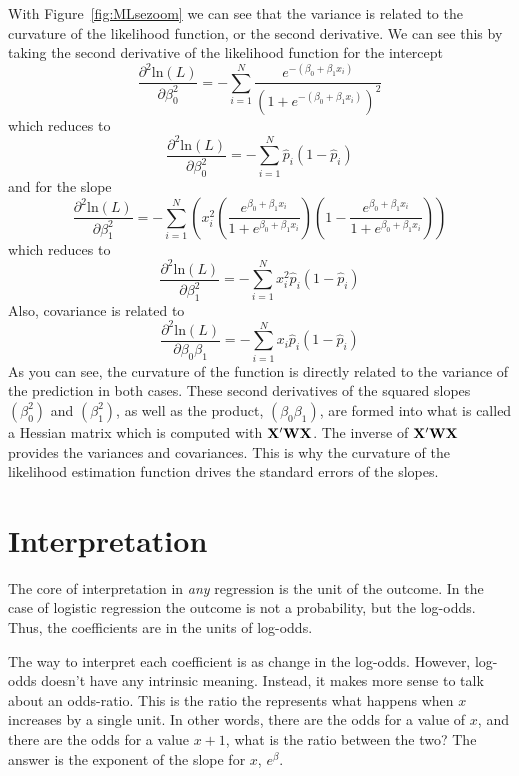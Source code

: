 With Figure~\ref{fig:MLsezoom} we can see that the variance is related to the curvature of the likelihood function, or the second derivative. We can see this by taking the second derivative of the likelihood function for the intercept
\[
\frac{\partial^2\mbox{ln}\left(L\right)}{\partial\beta_0^2}=-\sum_{i=1}^N\frac{e^{-\left(\beta_0+\beta_1x_i\right)}}{\left(1+e^{-\left(\beta_0+\beta_1x_i\right)}\right)^2}
\]
which reduces to
\begin{equation}
\frac{\partial^2\mbox{ln}\left(L\right)}{\partial\beta_0^2}=-\sum_{i=1}^N\hat{p}_i\left(1-\hat{p}_i\right)
\end{equation}
and for the slope
\[
\frac{\partial^2\mbox{ln}\left(L\right)}{\partial\beta_1^2} = -\sum_{i=1}^N\left(x_i^2\left(\frac{e^{\beta_0+\beta_1x_i}}{1+e^{\beta_0+\beta_1x_i}}\right)\left(1-\frac{e^{\beta_0+\beta_1x_i}}{1+e^{\beta_0+\beta_1x_i}}\right)\right)
\]
which reduces to
\begin{equation}
\frac{\partial^2\mbox{ln}\left(L\right)}{\partial\beta_1^2}=-\sum_{i=1}^Nx_i^2\hat{p}_i\left(1-\hat{p}_i\right)
\end{equation}
Also, covariance is related to
\begin{equation}
\frac{\partial^2\mbox{ln}\left(L\right)}{\partial\beta_0\beta_1}=-\sum_{i=1}^Nx_i\hat{p}_i\left(1-\hat{p}_i\right)
\end{equation}
As you can see, the curvature of the function is directly related to the variance of the prediction in both cases. These second derivatives of the squared slopes $(\beta_0^2)$ and $(\beta_1^2)$, as well as the product, $(\beta_0\beta_1)$, are formed into what is called a Hessian matrix which is computed with ${\bf{X'WX}}$.
The inverse of ${\bf{X'WX}}$ provides the variances and covariances. This is why the curvature of the likelihood estimation function drives the standard errors of the slopes.

\section{Interpretation}

The core of interpretation in {\it any} regression is the unit of the outcome. In the case of logistic regression the outcome is not a probability, but the log-odds. Thus, the coefficients are in the units of log-odds.

The way to interpret each coefficient is as change in the log-odds. However, log-odds doesn’t have any intrinsic meaning. Instead, it makes more sense to talk about an odds-ratio. This is the ratio the represents what happens when $x$ increases by a single unit. In other words, there are the odds for a value of $x$, and there are the odds for a value $x+1$, what is the ratio between the two? The answer is the exponent of the slope for $x$, $e^{\beta}$.

